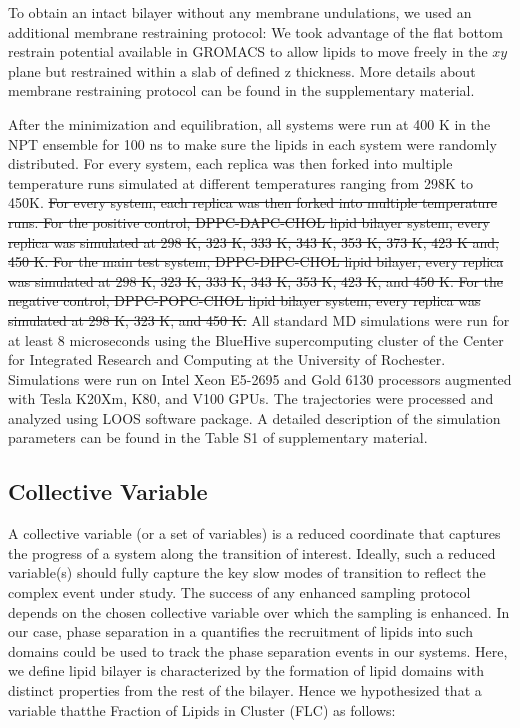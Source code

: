 \documentclass{biophys-new}
\begin{document}
To obtain an intact bilayer without any membrane undulations, we used an additional membrane restraining protocol: 
We took advantage of the flat bottom restrain potential available in GROMACS to allow lipids to move freely in the $xy$ plane but restrained within a slab of
defined z thickness.
More details about membrane restraining protocol can be found in the supplementary material.

After the minimization and equilibration, all systems were run at 400 K in the NPT ensemble for 100 ns to make sure the lipids in each system were
randomly distributed.
For every system, each replica was then forked into multiple temperature runs simulated at different temperatures ranging from 298K to 450K. 
\sout{For every system, each replica was then forked into multiple temperature runs. 
For the positive control, DPPC-DAPC-CHOL lipid bilayer system, every replica was simulated at 298 K, 323 K, 333 K, 343 K, 353 K, 373 K, 423 K and, 450 K. 
For the main test system, DPPC-DIPC-CHOL lipid bilayer, every replica was simulated at 298 K, 323 K, 333 K, 343 K, 353 K, 423 K, and 450 K. 
For the negative control, DPPC-POPC-CHOL lipid bilayer system, every replica was simulated at 298 K, 323 K, and 450 K.}
All standard MD simulations were run for at least 8 microseconds using the BlueHive supercomputing cluster of the Center for Integrated Research and
Computing at the University of Rochester. Simulations were run on Intel Xeon E5-2695 and Gold 6130 processors augmented with Tesla K20Xm, K80, and V100 GPUs.   
The trajectories were processed and analyzed using LOOS software package.
A detailed description of the simulation parameters can be found in the Table S1 of supplementary material.  

\subsection*{Collective Variable}

A collective variable (or a set of variables) is a reduced coordinate that captures the progress of a system along the transition of interest.
Ideally, such a reduced variable(s) should fully capture the key slow modes of transition to reflect the complex event under study.
The success of any enhanced sampling protocol depends on the chosen collective variable over which the sampling is enhanced. 
In our case, phase separation in a  quantifies the recruitment of lipids into such domains could be used to track the phase separation
events in our systems. Here, we define lipid bilayer is characterized by the formation of lipid domains with distinct properties from the rest of the bilayer.
Hence we hypothesized that a variable thatthe Fraction of Lipids in Cluster (FLC) as follows:
\end{document}
